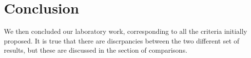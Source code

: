 \section{Conclusion}
\label{sec:conclusion} 

We then concluded our laboratory work, corresponding to all the criteria initially proposed. It is true that there are discrpancies between the two different set of results, but these are discussed in the section of comparisons. 

